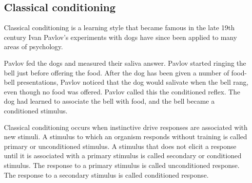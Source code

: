 \subsection{Classical conditioning}

Classical conditioning is a learning style that became famous in the late 19th century
Ivan Pavlov's experiments with dogs have since been applied to many areas of
psychology.

Pavlov fed the dogs and measured their saliva
answer. Pavlov started ringing the bell just before offering the food.
After the dog has been given a  number of food-bell presentations,
Pavlov noticed that the dog would salivate when the bell rang, even
though no food was offered. Pavlov called this the conditioned reflex.
The dog had learned to associate the bell with food, and the bell
became a conditioned stimulus.

Classical conditioning occurs when instinctive drive responses are associated
with new stimuli.
A stimulus to which an organism responds without training is called
primary or unconditioned stimulus. A stimulus that does not elicit a
response until it is associated with a primary stimulus is called
secondary or conditioned stimulus. The response to a primary stimulus
is called unconditioned response. The response to a secondary stimulus
is called conditioned response. \cite{Rehman2022Aug}
